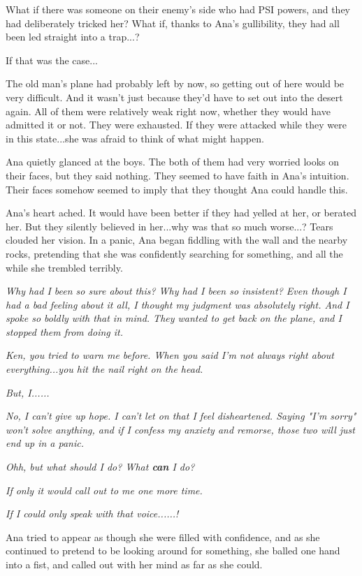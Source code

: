 \documentclass[
]{article}
\begin{document}
What if there was someone on their enemy's side who had PSI powers, and
they had deliberately tricked her? What if, thanks to Ana's gullibility,
they had all been led straight into a trap...?

If that was the case...

The old man's plane had probably left by now, so getting out of here
would be very difficult. And it wasn't just because they'd have to set
out into the desert again. All of them were relatively weak right now,
whether they would have admitted it or not. They were exhausted. If they
were attacked while they were in this state...she was afraid to think of
what might happen.

Ana quietly glanced at the boys. The both of them had very worried looks
on their faces, but they said nothing. They seemed to have faith in
Ana's intuition. Their faces somehow seemed to imply that they thought
Ana could handle this.

Ana's heart ached. It would have been better if they had yelled at her,
or berated her. But they silently believed in her...why was that so much
worse...? Tears clouded her vision. In a panic, Ana began fiddling with
the wall and the nearby rocks, pretending that she was confidently
searching for something, and all the while she trembled terribly.

\emph{Why had I been so sure about this? Why had I been so insistent?
Even though I had a bad feeling about it all, I thought my judgment was
absolutely right. And I spoke so boldly with that in mind. They wanted
to get back on the plane, and I stopped them from doing it.}

\emph{Ken, you tried to warn me before. When you said I'm not always
right about everything...you hit the nail right on the head.}

\emph{But, I......}

\emph{No, I can't give up hope. I can't let on that I feel disheartened.
Saying "I'm sorry" won't solve anything, and if I confess my anxiety and
remorse, those two will just end up in a panic.}

\emph{Ohh, but what should I do? What \textbf{can} I do?}

\emph{If only it would call out to me one more time.}

\emph{If I could only speak with that voice......!}

Ana tried to appear as though she were filled with confidence, and as
she continued to pretend to be looking around for something, she balled
one hand into a fist, and called out with her mind as far as she could.
\end{document}
